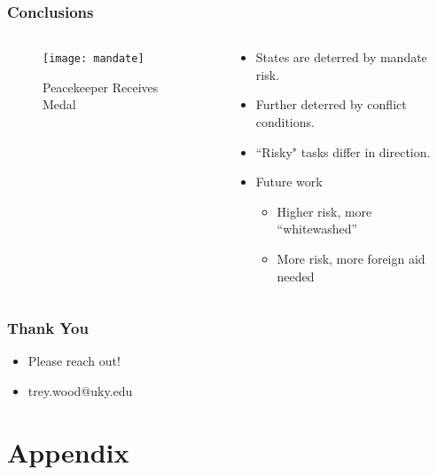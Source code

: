 \documentclass{beamer}
\begin{document}
\begin{frame}
\frametitle{Conclusions}


\begin{columns}
\begin{column}{0.5\textwidth}
    \begin{figure}
    \centering
        \texttt{[image: mandate]}
        \caption{Peacekeeper Receives Medal}
    \end{figure}
\end{column}
\begin{column}{0.5\textwidth}
        \begin{itemize}
        \pause
        \item States are deterred by mandate risk.
        \item Further deterred by conflict conditions. 
        \item ``Risky" tasks differ in direction.
        \pause
        \item Future work
        \begin{itemize}
          \item Higher risk, more ``whitewashed''
          \item More risk, more foreign aid needed 
        \end{itemize}
        \end{itemize}
\end{column}
\end{columns}

\end{frame}


\begin{frame}
\frametitle{Thank You}

\centering
\begin{itemize}
\item Please reach out!
\item trey.wood@uky.edu
\end{itemize}
\end{frame}

\section{Appendix}

\end{document}
